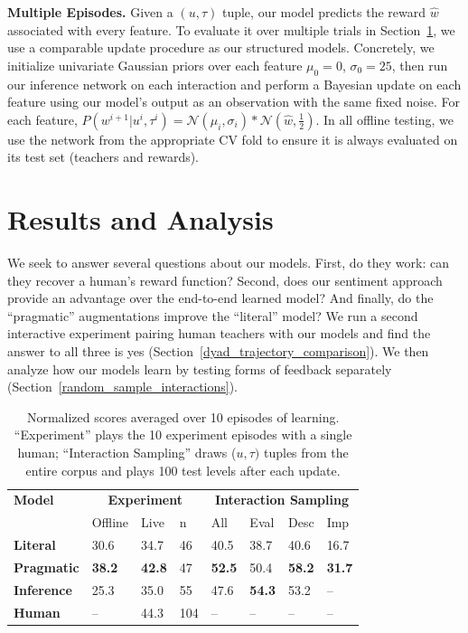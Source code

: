 \documentclass[letterpaper]{article} %
\begin{document}
\textbf{Multiple Episodes.} Given a $(u, \tau)$ tuple, our model predicts the reward $\hat{w}$ associated with every feature. To evaluate it over multiple trials in Section~\ref{results_and_analysis_section}, we use a comparable update procedure as our structured models. Concretely, we initialize univariate Gaussian priors over each feature $\mu_0 = 0$, $\sigma_0 = 25$, then run our inference network on each interaction and perform a Bayesian update on each feature using our model's output as an observation with the same fixed noise. For each feature, $P(w^{i+1} | u^i, \tau^i) = \mathcal{N}(\mu_{i},\sigma_{i}) * \mathcal{N}(\hat{w}, \frac{1}{2})$. In all offline testing, we use the network from the appropriate CV fold to ensure it is always evaluated on its test set (teachers and rewards).

\section{Results and Analysis}
\label{results_and_analysis_section}
We seek to answer several questions about our models. First, do they work: can they recover a human's reward function? Second, does our sentiment approach provide an advantage over the end-to-end learned model? And finally, do the ``pragmatic'' augmentations improve the ``literal'' model? We run a second interactive experiment pairing human teachers with our models and find the answer to all three is yes (Section~\ref{dyad_trajectory_comparison}). We then analyze how our models learn by testing forms of feedback separately (Section~\ref{random_sample_interactions}).

\tabcolsep=1.2mm
\begin{table}[t]
\begin{center}
\begin{tabular}{l|lll|llll}
\textbf{Model}     & \multicolumn{3}{c|}{\textbf{Experiment}} & \multicolumn{4}{c}{\textbf{Interaction Sampling}} \\
                        & Offline  & Live  & n      &All            &Eval     &Desc        &Imp\\ \hline
\textbf{Literal}        &  30.6     & 34.7      & 46           & 40.5           & 38.7          & 40.6              & 16.7          \\
\textbf{Pragmatic}      & \textbf{38.2}      & \textbf{42.8}      & 47               & \textbf{52.5} & 50.4          & \textbf{58.2}   & \textbf{31.7}\\
\textbf{Inference}  & 25.3      & 35.0     & 55               & 47.6            & \textbf{54.3} & 53.2              & --         \\
\textbf{Human}          & --        & 44.3      & 104         & --                &--             &--             &--
\end{tabular}
\caption{Normalized scores averaged over 10 episodes of learning. ``Experiment'' plays the 10 experiment episodes with a single human; ``Interaction Sampling'' draws ($u,\tau)$ tuples from the entire corpus and plays 100 test levels after each update.}
\label{tab:pragmatics_and_utterance_type_table}
\end{center}
\end{table}
\end{document}
